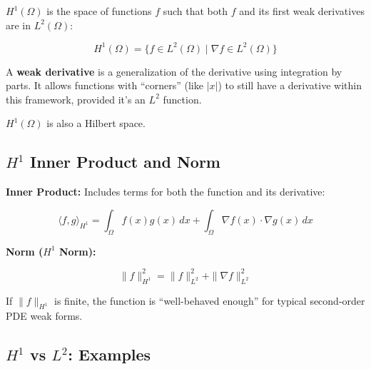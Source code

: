 \documentclass[
  11pt,
  a4paper,
]{scrbook}
\begin{document}
\begin{tcolorbox}[enhanced jigsaw, opacitybacktitle=0.6, leftrule=.75mm, colframe=quarto-callout-note-color-frame, toptitle=1mm, breakable, bottomtitle=1mm, opacityback=0, colback=white, rightrule=.15mm, colbacktitle=quarto-callout-note-color!10!white, arc=.35mm, left=2mm, toprule=.15mm, bottomrule=.15mm, titlerule=0mm, coltitle=black, title=\textcolor{quarto-callout-note-color}{\faInfo}\hspace{0.5em}{Definition}]

\(H^1(\Omega)\) is the space of functions \(f\) such that both \(f\) and
its first weak derivatives are in \(L^2(\Omega)\):

\[H^1(\Omega) = \{ f \in L^2(\Omega) \mid \nabla f \in L^2(\Omega) \}\]

A \textbf{weak derivative} is a generalization of the derivative using
integration by parts. It allows functions with ``corners'' (like
\(|x|\)) to still have a derivative within this framework, provided it's
an \(L^2\) function.

\(H^1(\Omega)\) is also a Hilbert space.

\end{tcolorbox}

\subsection{\texorpdfstring{\(H^1\) Inner Product and
Norm}{H\^{}1 Inner Product and Norm}}\label{h1-inner-product-and-norm}

\textbf{Inner Product:} Includes terms for both the function and its
derivative:

\[\langle f, g\rangle_{H^1} = \int_{\Omega} f(x) g(x) \,dx + \int_{\Omega} \nabla f(x) \cdot \nabla g(x) \,dx\]

\textbf{Norm (\(H^1\) Norm):}

\[\|f\|_{H^1}^2 = \|f\|_{L^2}^2 + \|\nabla f\|_{L^2}^2\]

If \(\|f\|_{H^1}\) is finite, the function is ``well-behaved enough''
for typical second-order PDE weak forms.

\subsection{\texorpdfstring{\(H^1\) vs \(L^2\):
Examples}{H\^{}1 vs L\^{}2: Examples}}\label{h1-vs-l2-examples}
\end{document}
